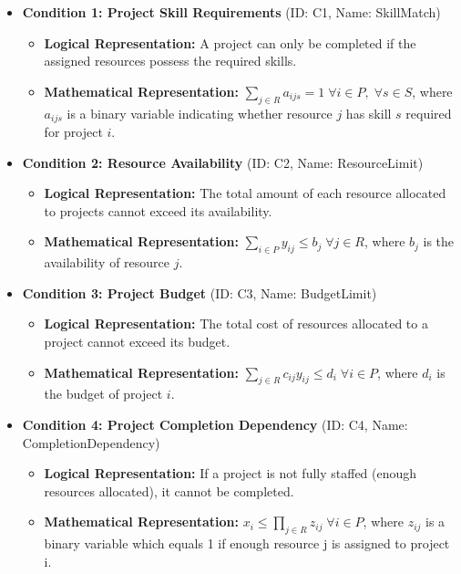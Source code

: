 \documentclass{article}
\begin{document}
\begin{itemize}
    \item \textbf{Condition 1: Project Skill Requirements} (ID: C1, Name: SkillMatch)
    \begin{itemize}
        \item \textbf{Logical Representation:} A project can only be completed if the assigned resources possess the required skills.
        \item \textbf{Mathematical Representation:} $\sum_{j \in R} a_{ijs} = 1 \; \forall i \in P, \; \forall s \in S$, where $a_{ijs}$ is a binary variable indicating whether resource $j$ has skill $s$ required for project $i$.
    \end{itemize}
    \item \textbf{Condition 2: Resource Availability} (ID: C2, Name: ResourceLimit)
    \begin{itemize}
        \item \textbf{Logical Representation:} The total amount of each resource allocated to projects cannot exceed its availability.
        \item \textbf{Mathematical Representation:} $\sum_{i \in P} y_{ij} \le b_j \; \forall j \in R$, where $b_j$ is the availability of resource $j$.
    \end{itemize}
    \item \textbf{Condition 3: Project Budget} (ID: C3, Name: BudgetLimit)
    \begin{itemize}
        \item \textbf{Logical Representation:} The total cost of resources allocated to a project cannot exceed its budget.
        \item \textbf{Mathematical Representation:} $\sum_{j \in R} c_{ij} y_{ij} \le d_i \; \forall i \in P$, where $d_i$ is the budget of project $i$.
    \end{itemize}
    \item \textbf{Condition 4: Project Completion Dependency} (ID: C4, Name: CompletionDependency)
    \begin{itemize}
        \item \textbf{Logical Representation:} If a project is not fully staffed (enough resources allocated), it cannot be completed.
        \item \textbf{Mathematical Representation:} $x_i \le \prod_{j \in R}  z_{ij} \; \forall i \in P$, where $z_{ij}$ is a binary variable which equals 1 if enough resource j is assigned to project i.
    \end{itemize}
\end{itemize}
\end{document}
